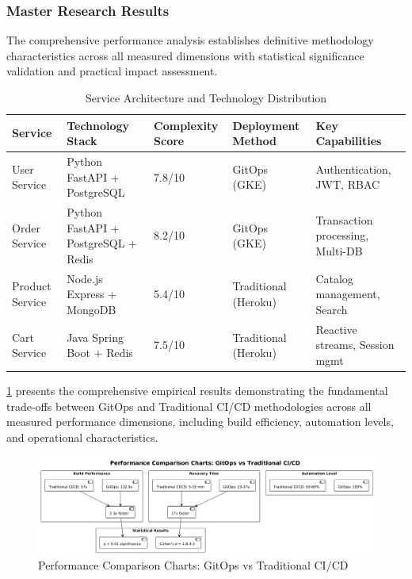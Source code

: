 \subsubsection{Master Research Results}

The comprehensive performance analysis establishes definitive methodology characteristics across all measured dimensions with statistical significance validation and practical impact assessment.

\begin{table}[H]
\centering
\caption{Service Architecture and Technology Distribution}
\label{tab:service-architecture-comparison}
\renewcommand{\arraystretch}{1.2}
\footnotesize
\begin{tabular}{|p{2.2cm}|p{3.5cm}|p{1.8cm}|p{2.8cm}|p{3.2cm}|}
\hline
\textbf{Service} & \textbf{Technology Stack} & \textbf{Complexity Score} & \textbf{Deployment Method} & \textbf{Key Capabilities} \\
\hline
User Service & Python FastAPI + PostgreSQL & 7.8/10 & GitOps (GKE) & Authentication, JWT, RBAC \\
\hline
Order Service & Python FastAPI + PostgreSQL + Redis & 8.2/10 & GitOps (GKE) & Transaction processing, Multi-DB \\
\hline
Product Service & Node.js Express + MongoDB & 5.4/10 & Traditional (Heroku) & Catalog management, Search \\
\hline
Cart Service & Java Spring Boot + Redis & 7.5/10 & Traditional (Heroku) & Reactive streams, Session mgmt \\
\hline
\end{tabular}
\end{table}

\ref{fig:performance-comparison-charts} presents the comprehensive empirical results demonstrating the fundamental trade-offs between GitOps and Traditional CI/CD methodologies across all measured performance dimensions, including build efficiency, automation levels, and operational characteristics.

\begin{figure}[H]
\centering
\includegraphics[width=1.0\textwidth]{figures/Performance-Comparison-Charts.png}
\caption{Performance Comparison Charts: GitOps vs Traditional CI/CD}
\label{fig:performance-comparison-charts}
\end{figure}


